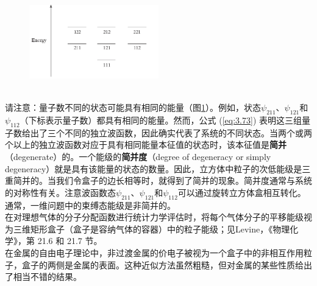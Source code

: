 	\begin{figure}[h!]
		\centering
		\includegraphics[width=0.5\textwidth]{Figures/3.3.png}  %
		\caption{}
		\label{fig:3.3}
	\end{figure}
	\\
	\indent 请注意：量子数不同的状态可能具有相同的能量（图\ref{fig:3.3}）。例如，状态$\psi_{211}$、$\psi_{121}$和$\psi_{112}$（下标表示量子数）都具有相同的能量。然而，公式 (\ref{eq:3.73}) 表明这三组量子数给出了三个不同的独立波函数，因此确实代表了系统的不同状态。当两个或两个以上的独立波函数对应于具有相同能量本征值的状态时，该本征值是\textbf{简并}（degenerate）的。一个能级的\textbf{简并度}（degree of degeneracy or simply degeneracy）就是具有该能量的状态的数量。因此，立方体中粒子的次低能级是三重简并的。当我们令盒子的边长相等时，就得到了简并的现象。简并度通常与系统的对称性有关。注意波函数态$\psi_{211}$、$\psi_{121}$和$\psi_{112}$可以通过旋转立方体盒相互转化。通常，一维问题中的束缚态能级是非简并的。\\
	\indent 在对理想气体的分子分配函数进行统计力学评估时，将每个气体分子的平移能级视为三维矩形盒子（盒子是容纳气体的容器）中的粒子能级；见Levine，《物理化学》，第 21.6 和 21.7 节。\\
	\indent 在金属的自由电子理论中，非过渡金属的价电子被视为一个盒子中的非相互作用粒子，盒子的两侧是金属的表面。这种近似方法虽然粗糙，但对金属的某些性质给出了相当不错的结果。
	
